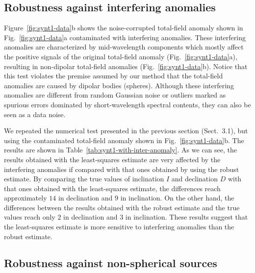 \documentclass[journal abbreviation, npg]{copernicus}
\begin{document}
\subsection{Robustness against interfering anomalies}

Figure~\ref{fig:synt1-data}b shows the noise-corrupted total-field
anomaly shown in Fig.~\ref{fig:synt1-data}a contaminated with
interfering anomalies. These interfering anomalies are characterized
by mid-wavelength components which mostly affect the positive signals
of the original total-field anomaly (Fig.~\ref{fig:synt1-data}a),
resulting in non-dipolar total-field anomalies
(Fig.~\ref{fig:synt1-data}b). Notice that this test violates the
premise assumed by our method that the total-field anomalies are
caused by dipolar bodies (spheres). Although these interfering
anomalies are different from random Gaussian noise or outliers marked
as spurious errors dominated by short-wavelength spectral contents,
they can also be seen as a data noise.

We repeated the numerical test presented in the previous section (Sect.~3.1),
but using the contaminated total-field anomaly shown in
Fig.~\ref{fig:synt1-data}b. The results are shown in
Table~\ref{tab:synt1-with-inter-anomaly}. As we can see, the results obtained
with the least-squares estimate are very affected by the interfering
anomalies if compared with that ones obtained by using the robust estimate.
By comparing the true values of inclination $I$ and declination $D$ with that
ones obtained with the least-squares estimate, the differences reach
approximately $14${\degree} in declination and $9${\degree} in inclination.
On the other hand, the differences between the results obtained with the
robust estimate and the true values reach only $2${\degree} in declination
and $3${\degree} in inclination. These results suggest that the least-squares
estimate is more sensitive to interfering anomalies than the robust estimate.

\subsection{Robustness against non-spherical sources}
\end{document}
